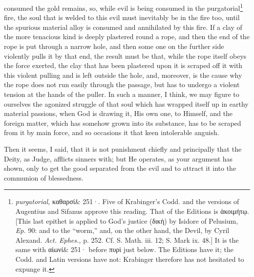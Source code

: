 consumed the gold remains, so, while evil is being consumed in the purgatorial\footnote{\emph{purgatorial,} \textgreek{καθαρσί\& 251·}. Five of Krabinger’s Codd. and the versions of Augentius and Sifanus approve this reading. That of the Editions is \textgreek{ἀκοιμήτῳ}. [This last epithet is applied to God’s justice (δικὴ) by Isidore of Pelusium, \emph{Ep.} 90: and to the “worm,” and, on the other hand, the Devil, by Cyril Alexand. \emph{Act. Ephes.,} p. 252. Cf. S. Math. iii. 12; S. Mark ix. 48.] It is the same with \textgreek{αἰωνί\& 251·} before \textgreek{πυρὶ} just below. The Editions have it; the Codd. and Latin versions have not: Krabinger therefore has not hesitated to expunge it.} fire, the soul that is welded to this evil must inevitably be in the fire too, until the spurious material alloy is consumed and annihilated by this fire. If a clay of the more tenacious kind is deeply plastered round a rope, and then the end of the rope is put through a narrow hole, and then some one on the further side violently pulls it by that end, the result must be that, while the rope itself obeys the force exerted, the clay that has been plastered upon it is scraped off it with this violent pulling and is left outside the hole, and, moreover, is the cause why the rope does not run easily through the passage, but has to undergo a violent tension at the hands of the puller. In such a manner, I think, we may figure to ourselves the agonized struggle of that soul which has wrapped itself up in earthy material passions, when God is drawing it, His own one, to Himself, and the foreign matter, which has somehow grown into its substance, has to be scraped from it by main force, and so occasions it that keen intolerable anguish.

Then it seems, I said, that it is not punishment chiefly and principally that the Deity, as Judge, afflicts sinners with; but He operates, as your argument has shown, only to get the good separated from the evil and to attract it into the communion of blessedness.

